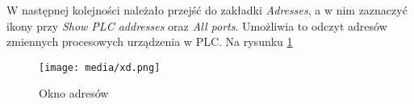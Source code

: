\documentclass{article}
\begin{document}
\newpage

W następnej kolejności należało przejść do zakładki \textit{Adresses}, a w nim zaznaczyć ikony przy \textit{Show PLC addresses} oraz \textit{All ports}.
Umożliwia to odczyt adresów zmiennych procesowych urządzenia w PLC. Na rysunku \ref{fig:adresy} %


\begin{figure}[H]
    \centering
    \texttt{[image: media/xd.png]}
    \caption{Okno adresów}
    \label{fig:adresy}
\end{figure}
\end{document}
